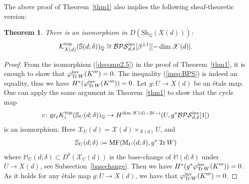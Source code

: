 \documentclass [11pt,oneside,a4paper,mathscr]{amsart}
\newtheorem{thm}{Theorem}[section]
\theoremstyle{definition}
\newcommand{\X}{\mathscr{X}}
\newcommand{\Tr}{\mathop{\rm Tr}}
\begin{document}
The above proof of Theorem~\ref{thm1}
also implies the following sheaf-theoretic version: 
\begin{thm}\label{thm:Ksheaf2}
There is an isomorphism in $D(\mathrm{Sh}_{\mathbb{Q}}(X(d)))$:
\begin{align*}
    \mathcal{K}_{X(d)}^{\rm{top}}(\mathbb{S}(d; \delta))_{\mathbb{Q}}
    \cong \mathcal{BPS}_{d, \delta}^{\rm{inv}}[\beta^{\pm 1}][-\dim \X(d)]. 
\end{align*}
    \end{thm}
\begin{proof}
From the isomorphism (\ref{decomp2.5})
in the proof of Theorem~\ref{thm1}, it is enough to show 
that $\varphi_{\Tr W}^{\rm{inv}}(K''')=0$. 
The inequality (\ref{ineq:BPS}) is indeed an equality, 
thus we have $H^{\ast}(\varphi_{\Tr W}^{\rm{inv}}(K'''))=0$. 
Let $g \colon U \to X(d)$ be an étale map. 
One can apply the same argument in Theorem~\ref{thm1} to show 
that the cycle map 
\begin{align*}
    c \colon \mathrm{gr}_{\ell}K_i^{\rm{top}}(\mathbb{S}_U(d; \delta))_{\mathbb{Q}}
    \to H^{\dim \X(d)-2\ell-i}(U, g^{\ast}\mathcal{BPS}^{\mathrm{inv}}_{d, \delta}[1])
\end{align*}
is an isomorphism. 
Here $\X_U(d)=\X(d) \times_{X(d)} U$, 
and 
\begin{align*}\mathbb{S}_U(d; \delta)
:=\mathrm{MF}(\mathbb{M}_U(d; \delta), g^{\ast}\Tr W)
\end{align*}
where $\mathbb{M}_U(d; \delta) \subset D^b(\X_U(d))$
is the base-change of $\mathbb{M}(d; \delta)$
under $U \to X(d)$, see Subsection~\ref{basechange}.
Then we have $H^{\ast}(g^{\ast}\varphi_{\Tr W}^{\rm{inv}}(K'''))=0$. 
As it holds for any étale map $g \colon U \to X(d)$, 
we have that $\varphi_{\Tr W}^{\rm{inv}}(K''')=0$.
    \end{proof}
\end{document}
